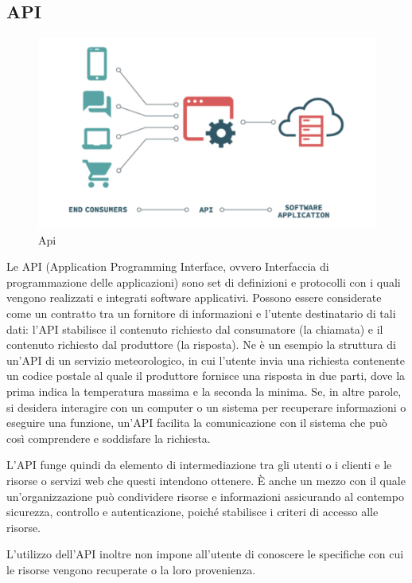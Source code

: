 \documentclass[12pt,a4paper]{article}
\begin{document}
\subsection{API}
\begin{figure}[H]
    \centering
    \includegraphics[width=.9\linewidth]{api.png}
    \caption{Api}
\end{figure}

Le API (Application Programming Interface, ovvero Interfaccia di programmazione delle applicazioni) sono set di definizioni e protocolli con i quali vengono realizzati e integrati software applicativi. Possono essere considerate come un contratto tra un fornitore di informazioni e l'utente destinatario di tali dati: l'API stabilisce il contenuto richiesto dal consumatore (la chiamata) e il contenuto richiesto dal produttore (la risposta). Ne è un esempio la struttura di un'API di un servizio meteorologico, in cui l'utente invia una richiesta contenente un codice postale al quale il produttore fornisce una risposta in due parti, dove la prima indica la temperatura massima e la seconda la minima.
\hfill \break \break
Se, in altre parole, si desidera interagire con un computer o un sistema per recuperare informazioni o eseguire una funzione, un'API facilita la comunicazione con il sistema che può così comprendere e soddisfare la richiesta.

L'API funge quindi da elemento di intermediazione tra gli utenti o i clienti e le risorse o servizi web che questi intendono ottenere. È anche un mezzo con il quale un'organizzazione può condividere risorse e informazioni assicurando al contempo sicurezza, controllo e autenticazione, poiché stabilisce i criteri di accesso alle risorse.


L'utilizzo dell'API inoltre non impone all'utente di conoscere le specifiche con cui le risorse vengono recuperate o la loro provenienza.
\end{document}
